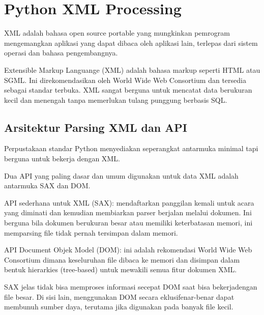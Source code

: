 \section{Python XML Processing} 
\hspace*{0.5in} XML adalah bahasa open source portable yang mungkinkan pemrogram mengemangkan aplikasi yang dapat dibaca oleh aplikasi lain, terlepas dari sistem operasi dan bahasa pengembangnya. 
\vspace{12pt}
 
\hspace*{0.5in} Extensible Markup Languange (XML) adalah bahasa markup seperti HTML atau SGML. Ini direkomendasikan oleh World Wide Web Consortium dan tersedia sebagai standar terbuka. XML sangat berguna untuk mencatat data berukuran kecil dan menengah tanpa memerlukan tulang punggung berbasis SQL. 

\vspace{12pt}
\subsection{Arsitektur Parsing XML dan API} 
 
\hspace*{0.5in} Perpustakaan standar Python menyediakan seperangkat antarmuka minimal tapi berguna untuk bekerja dengan XML.  
 
\hspace*{0.5in} Dua API yang paling dasar dan umum digunakan untuk data XML adalah antarmuka SAX dan DOM. 
 
\hspace*{0.5in} API sederhana untuk XML (SAX): mendaftarkan panggilan kemali untuk acara yang diminati dan kemudian membiarkan parser berjalan melalui dokumen. Ini berguna bila dokumen berukuran besar atau memiliki keterbatasan memori, ini memparsing file tidak pernah tersimpan dalam memori. 
 
\hspace*{0.5in} API Document Objek Model (DOM): ini adalah rekomendasi World Wide Web Consortium dimana keseluruhan file dibaca ke memori dan disimpan dalam bentuk hierarkies (tree-based) untuk mewakili semua fitur dokumen XML.  
 
\hspace*{0.5in} SAX jelas tidak bisa memproses informasi secepat DOM saat bisa bekerjadengan file besar. Di sisi lain, menggunakan DOM secara eklusifenar-benar dapat membunuh sumber daya, terutama jika digunakan pada banyak file kecil. 
 
